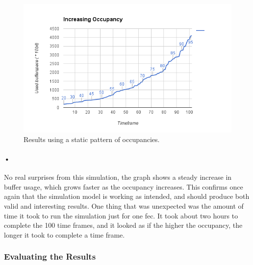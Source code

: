 \documentclass[a4paper, 12pt]{report}
\begin{document}
\begin{figure}[h!]
	\centering
		\includegraphics[width=1.0\textwidth]{images/increasing-occ.png}
		\caption{Results using a static pattern of occupancies.}
		\label{fig:increasing-occ}
\end{figure}

\paragraph{•} %
No real surprises from this simulation, the graph shows a steady increase in buffer usage, which grows faster as the occupancy increases.
This confirms once again that the simulation model is working as intended, and should produce both valid and interesting results.
One thing that was unexpected was the amount of time it took to run the simulation just for one \gls{fec}.
It took about two hours to complete the 100 time frames, and it looked as if the higher the occupancy, the longer it took to complete a time frame.

\subsubsection{Evaluating the Results}
\end{document}
